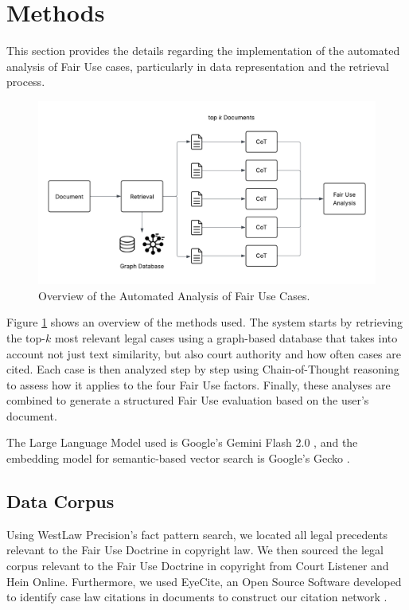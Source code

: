 \section{Methods}
\label{sec: Methods}

This section provides the details regarding the implementation of the automated analysis of Fair Use cases, particularly in data representation and the retrieval process.

\begin{figure}[h]
    \centering
    \includegraphics[width=\linewidth]{FairUseAnalysis.png}
    \caption{Overview of the Automated Analysis of Fair Use Cases.}
    \label{fig:fair_use_legal_bot}
\end{figure}

Figure \ref{fig:fair_use_legal_bot} shows an overview
of the methods used. The system starts by retrieving the top-$k$ most relevant legal cases using a graph-based database that takes into account not just text similarity, but also court authority and how often cases are cited. Each case is then analyzed step by step using Chain-of-Thought reasoning to assess how it applies to the four Fair Use factors. Finally, these analyses are combined to generate a structured Fair Use evaluation based on the user’s document.

The Large Language Model used is Google's Gemini Flash 2.0 \cite{11_GeminiLLM}, and the embedding model for semantic-based vector search is Google's Gecko \cite{29_GeckoEmbeddings}.

\subsection{Data Corpus}

Using WestLaw Precision's fact pattern search, we located all legal precedents relevant to the Fair Use Doctrine in copyright law. We then sourced the legal corpus relevant to the Fair Use Doctrine in copyright from Court Listener \cite{25_free_law_project_recap_2020} and Hein Online. Furthermore, we used EyeCite, an Open Source Software developed to identify case law citations in documents to construct our citation network \cite{24_eyecite}. 

